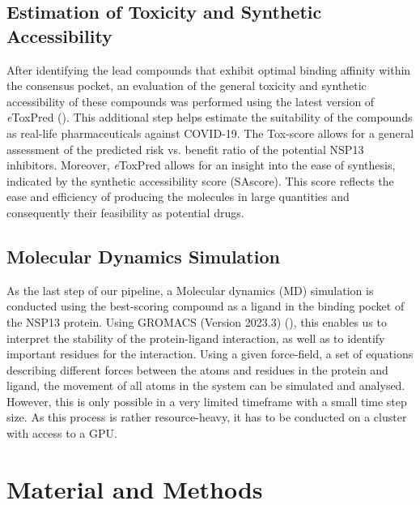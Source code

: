 \documentclass[11pt, letterpaper, titlepage]{article}
\begin{document}
\subsection{Estimation of Toxicity and Synthetic Accessibility}
 After identifying the lead compounds that exhibit optimal binding affinity within the consensus pocket, an evaluation of the general toxicity and synthetic accessibility of these compounds was performed using the latest version of \textit{e}ToxPred (\cite{pu2019toxpred}). This additional step helps estimate the suitability of the compounds as real-life pharmaceuticals against COVID-19. The Tox-score allows for a general assessment of the predicted risk vs. benefit ratio of the potential NSP13 inhibitors. Moreover, \textit{e}ToxPred allows for an insight into the ease of synthesis, indicated by the synthetic accessibility score (SAscore). This score reflects the ease and efficiency of producing the molecules in large quantities and consequently their feasibility as potential drugs. 

\subsection{Molecular Dynamics Simulation}
As the last step of our pipeline, a Molecular dynamics (MD) simulation is conducted using the best-scoring compound as a ligand in the binding pocket of the NSP13 protein. Using GROMACS (Version 2023.3) (\cite{package_GROMACS}), this enables us to interpret the stability of the protein-ligand interaction, as well as to identify important residues for the interaction. Using a given force-field, a set of equations describing different forces between the atoms and residues in the protein and ligand, the movement of all atoms in the system can be simulated and analysed. However, this is only possible in a very limited timeframe with a small time step size. As this process is rather resource-heavy, it has to be conducted on a cluster with access to a GPU. 


\section{Material and Methods}
\end{document}
